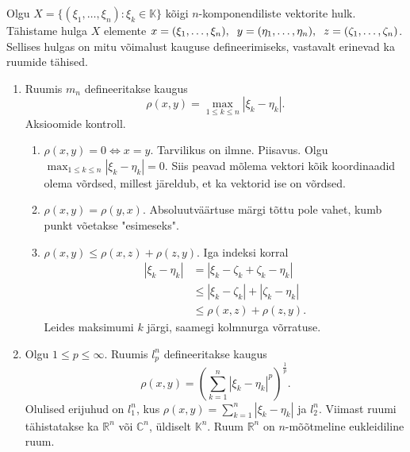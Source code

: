 \documentclass{article}[12pt]
\newcommand{\h}{\hspace{0.2cm}}
\newcommand{\R}{\mathbb{R}}
\newcommand{\K}{\mathbb{K}}
\newcommand{\C}{\mathbb{C}}
\theoremstyle{definition}
\theoremstyle{definition}
\begin{document}
Olgu $X=\{(\xi_1,\dots,\xi_n): \xi_k\in\K\}$ kõigi $n$-komponendiliste vektorite hulk.
Tähistame hulga $X$ elemente $x=(\xi_1,\dots,\xi_n),\h y=(\eta_1,\dots,\eta_n),\h z=(\zeta_1,\dots,\zeta_n)$.
Sellises hulgas on mitu võimalust kauguse defineerimiseks, vastavalt erinevad ka ruumide tähised.
\begin{enumerate}
	\item Ruumis $m_n$ defineeritakse kaugus
	\[
		\rho(x,y) = \max_{1\leq k \leq n} |\xi_k-\eta_k|.
	\]
	Aksioomide kontroll.
	\begin{enumerate}
		\item $\rho(x,y) = 0 \Leftrightarrow x=y$.
		Tarvilikus on ilmne. 
		Piisavus. 
		Olgu $\max_{1\leq k \leq n} |\xi_k-\eta_k| = 0$. 
		Siis peavad mõlema vektori kõik koordinaadid olema võrdsed, millest järeldub, et ka vektorid ise on võrdsed.
		\item $\rho(x,y) = \rho(y,x)$.
		Absoluutväärtuse märgi tõttu pole vahet, kumb punkt võetakse "esimeseks".
		\item $\rho(x,y) \leq \rho(x,z) + \rho(z,y)$.
		Iga indeksi korral
		\begin{align*}
			|\xi_k-\eta_k| &= |\xi_k-\zeta_k+\zeta_k-\eta_k| \\
			&\leq |\xi_k-\zeta_k|+|\zeta_k-\eta_k| \\
			&\leq \rho(x,z) + \rho(z,y).
		\end{align*}
		Leides maksimumi $k$ järgi, saamegi kolmnurga võrratuse.
	\end{enumerate}
	\item Olgu $1\leq p \leq \infty$.
	Ruumis $l_p^n$ defineeritakse kaugus
	\[
		\rho(x,y) = \left( \sum_{k=1}^n |\xi_k - \eta_k|^p \right)^{\frac{1}{p}}.
	\]
	Olulised erijuhud on $l_1^n$, kus $\rho(x,y) = \sum_{k=1}^n |\xi_k-\eta_k|$ ja $l_2^n$.
	Viimast ruumi tähistatakse ka $\R^n$ või $\C^n$, üldiselt $\K^n$.
	Ruum $\R^n$ on $n$-mõõtmeline eukleidiline ruum.


\end{enumerate}
\end{document}

